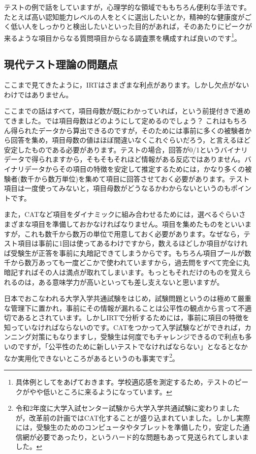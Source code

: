 \documentclass{ltjsbook}
\begin{document}
テストの例で話をしていますが，心理学的な領域でももちろん便利な手法です。たとえば高い認知能力レベルの人をとくに選出したいとか，精神的な健康度がごく低い人をしっかりと検出したいといった目的があれば，そのあたりにピークが来るような項目からなる質問項目からなる調査票を構成すれば良いのです\footnote{具体例として\textcite{kosugi120005596041}をあげておきます。学校適応感を測定するため，テストのピークがやや低いところに来るようになっています。}。


\subsection{現代テスト理論の問題点}
ここまで見てきたように，IRTはさまざまな利点があります。しかし欠点がないわけではありません。

ここまでの話はすべて，項目母数が既にわかっていれば，という前提付きで進めてきました。では項目母数はどのようにして定めるのでしょう？ これはもちろん得られたデータから算出できるのですが，そのためには事前に多くの被験者から回答を集め，項目母数の値はほぼ間違いなくこれぐらいだろう，と言えるほど安定したものである必要があります。テストの場合，回答が0/1というバイナリデータで得られますから，そもそもそれほど情報がある反応ではありません。バイナリデータからその項目の特徴を安定して推定するためには，かなり多くの被験者(数千から数万単位)を集めて項目に回答させておく必要があります。テスト項目は一度使ってみないと，項目母数がどうなるかわからないというのもポイントです。

また，CATなど項目をダイナミックに組み合わせるためには，選べるぐらいさまざまな項目を準備しておかなければなりません。項目を集めたものをといいますが，これも数千から数万の単位で用意しておく必要があります。なぜなら，テスト項目は事前に1回は使ってあるわけですから，数えるほどしか項目がなければ受験生が正答を事前に丸暗記できてしまうからです。もちろん項目プールが数千から数万あっても一度どこかで使われていますから，過去問をすべて完全に丸暗記すればその人は満点が取れてしまいます。もっともそれだけのものを覚えられるのは，ある意味学力が高いといっても差し支えないと思いますが。

日本でおこなわれる大学入学共通試験をはじめ，試験問題というのは極めて厳重な管理下に置かれ，事前にその情報が漏れることは公平性の観点から言って不適切であるとされています。しかしIRTで分析するためには，事前に項目の特徴を知っていなければならないのです。CATをつかって入学試験などができれば，カンニング対策にもなりますし，受験生は何度でもチャレンジできるので利点も多いのですが，「公平性のために新しいテストでなければならない」となるとなかなか実用化できないところがあるというのも事実です\footnote{令和2年度に大学入試センター試験から大学入学共通試験に変わりましたが，改革前の計画ではCAT化することが盛り込まれていました。しかし実際には，受験生のためのコンピュータやタブレットを準備したり，安定した通信網が必要であったり，というハード的な問題もあって見送られてしまいました。}。
\end{document}
